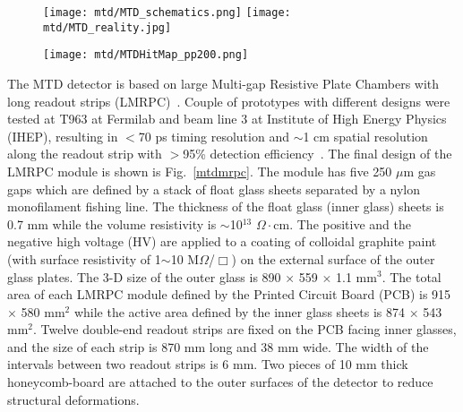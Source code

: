 \begin{figure}
\centering
\texttt{[image: mtd/MTD\_schematics.png]}
\texttt{[image: mtd/MTD\_reality.jpg]}
\label{mtdsys}
\end{figure}

\begin{figure}[htbp]
\centering
\texttt{[image: mtd/MTDHitMap\_pp200.png]}
\vspace*{-5mm}
 \label{mtdhitmap}
\end{figure}

The MTD detector is based on large Multi-gap Resistive Plate Chambers with long readout strips (LMRPC)~\cite{MTDdet}. Couple of prototypes with different designs were tested at T963 at Fermilab and beam line 3 at Institute of High Energy Physics (IHEP), resulting in $<$70 ps timing resolution and $\sim$1 cm spatial resolution along the readout strip with $>$95\% detection efficiency~\cite{MTDmrpc0,MTDmrpc1}. The final design of the LMRPC module is shown is Fig.~\ref{mtdmrpc}. The module has five 250 $\mu$m gas gaps which are defined by a stack of float glass sheets separated by a nylon monofilament fishing line. The thickness of the float glass (inner glass) sheets is 0.7 mm while the volume resistivity is $\sim$10$^{13}$ $\Omega\cdot$cm. The positive and the negative high voltage (HV) are applied to a coating of colloidal graphite paint (with surface resistivity of 1$\sim$10 M$\Omega$/$\Box$) on the external surface of the outer glass plates. The 3-D size of the outer glass is 890 $\times$ 559 $\times$ 1.1 mm$^{3}$. The total area of each LMRPC module defined by the Printed Circuit Board (PCB) is 915 $\times$ 580 mm$^{2}$ while the active area defined by the inner glass sheets is 874 $\times$ 543 mm$^{2}$. Twelve double-end readout strips are fixed on the PCB facing inner glasses, and the size of each strip is 870 mm long and 38 mm wide. The width of the intervals between two readout strips is 6 mm. Two pieces of 10 mm thick honeycomb-board are attached to the outer surfaces of the detector to reduce structural deformations.

